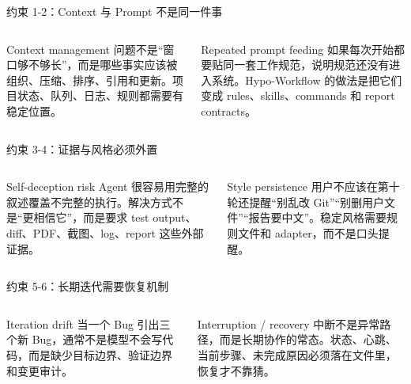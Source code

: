 \documentclass[theme=workflow,aspectratio=169,fontset=tech]{Hypo-Slide}
\begin{document}
\begin{frame}{约束 1-2：Context 与 Prompt 不是同一件事}
  \begin{columns}[T,totalwidth=\textwidth]
    \begin{block}{Context management}
      问题不是“窗口够不够长”，而是哪些事实应该被组织、压缩、排序、引用和更新。项目状态、队列、日志、规则都需要有稳定位置。
    \end{block}
    \begin{block}{Repeated prompt feeding}
      如果每次开始都要贴同一套工作规范，说明规范还没有进入系统。Hypo-Workflow 的做法是把它们变成 rules、skills、commands 和 report contracts。
    \end{block}
  \end{columns}
\end{frame}

\begin{frame}{约束 3-4：证据与风格必须外置}
  \begin{columns}[T,totalwidth=\textwidth]
    \begin{block}{Self-deception risk}
      Agent 很容易用完整的叙述覆盖不完整的执行。解决方式不是“更相信它”，而是要求 test output、diff、PDF、截图、log、report 这些外部证据。
    \end{block}
    \begin{block}{Style persistence}
      用户不应该在第十轮还提醒“别乱改 Git”“别删用户文件”“报告要中文”。稳定风格需要规则文件和 adapter，而不是口头提醒。
    \end{block}
  \end{columns}
\end{frame}

\begin{frame}{约束 5-6：长期迭代需要恢复机制}
  \begin{columns}[T,totalwidth=\textwidth]
    \begin{block}{Iteration drift}
      当一个 Bug 引出三个新 Bug，通常不是模型不会写代码，而是缺少目标边界、验证边界和变更审计。
    \end{block}
    \begin{block}{Interruption / recovery}
      中断不是异常路径，而是长期协作的常态。状态、心跳、当前步骤、未完成原因必须落在文件里，恢复才不靠猜。
    \end{block}
  \end{columns}
\end{frame}
\end{document}
